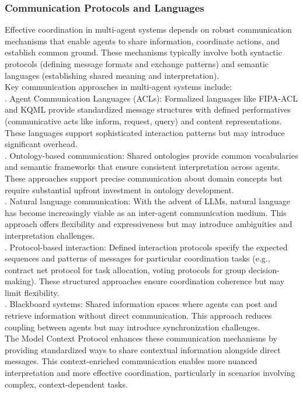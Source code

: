 \subsubsection{Communication Protocols and Languages}
Effective coordination in multi-agent systems depends on robust communication mechanisms that enable agents to share information, coordinate actions, and establish common ground. These mechanisms typically involve both syntactic protocols (defining message formats and exchange patterns) and semantic languages (establishing shared meaning and interpretation).\\ \newline
Key communication approaches in multi-agent systems include:\\ . Agent Communication Languages (ACLs): Formalized languages like FIPA-ACL and KQML provide standardized message structures with defined performatives (communicative acts like inform, request, query) and content representations. These languages support sophisticated interaction patterns but may introduce significant overhead.\\ . Ontology-based communication: Shared ontologies provide common vocabularies and semantic frameworks that ensure consistent interpretation across agents. These approaches support precise communication about domain concepts but require substantial upfront investment in ontology development.\\ . Natural language communication: With the advent of LLMs, natural language has become increasingly viable as an inter-agent communication medium. This approach offers flexibility and expressiveness but may introduce ambiguities and interpretation challenges.\\ . Protocol-based interaction: Defined interaction protocols specify the expected sequences and patterns of messages for particular coordination tasks (e.g., contract net protocol for task allocation, voting protocols for group decision-making). These structured approaches ensure coordination coherence but may limit flexibility.\\ . Blackboard systems: Shared information spaces where agents can post and retrieve information without direct communication. This approach reduces coupling between agents but may introduce synchronization challenges.\\ \newline
The Model Context Protocol enhances these communication mechanisms by providing standardized ways to share contextual information alongside direct messages. This context-enriched communication enables more nuanced interpretation and more effective coordination, particularly in scenarios involving complex, context-dependent tasks.\\
